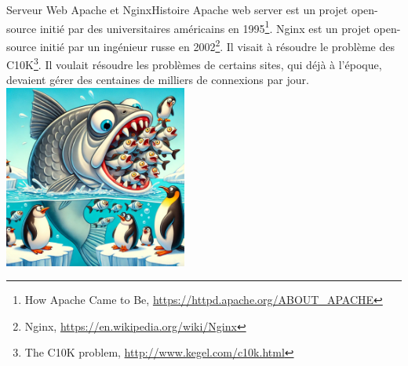 \documentclass{beamer}
\begin{document}
    \begin{frame}{Serveur Web Apache et Nginx}{Histoire}
        Apache web server est un projet open-source initié par des universitaires américains en 1995\footnote{How Apache Came to Be, \url{https://httpd.apache.org/ABOUT_APACHE}}.
        \bigbreak
        Nginx est un projet open-source initié par un ingénieur russe en 2002\footnote{Nginx, \url{https://en.wikipedia.org/wiki/Nginx}}.
        Il visait à résoudre le problème des C10K\footnote{The C10K problem, \url{http://www.kegel.com/c10k.html}}.
        Il voulait résoudre les problèmes de certains sites, qui déjà à l'époque, devaient gérer des centaines de milliers de connexions par jour.
        \bigbreak
        \centering
        \includegraphics[width=6cm]{image/big-fish-eating-many-litlle-fishes}
    \end{frame}
\end{document}
